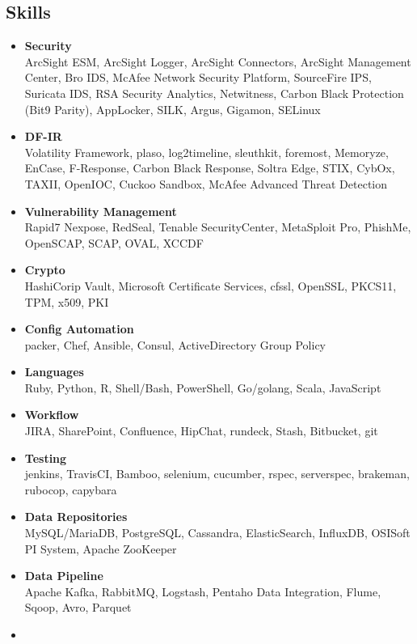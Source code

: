 \documentclass[10pt,]{article}
\begin{document}
\subsection{Skills}\label{skills}

\begin{itemize}
\item
  \textbf{Security}\\
  ArcSight ESM, ArcSight Logger, ArcSight Connectors, ArcSight
  Management Center, Bro IDS, McAfee Network Security Platform,
  SourceFire IPS, Suricata IDS, RSA Security Analytics, Netwitness,
  Carbon Black Protection (Bit9 Parity), AppLocker, SILK, Argus,
  Gigamon, SELinux
\item
  \textbf{DF-IR}\\
  Volatility Framework, plaso, log2timeline, sleuthkit, foremost,
  Memoryze, EnCase, F-Response, Carbon Black Response, Soltra Edge,
  STIX, CybOx, TAXII, OpenIOC, Cuckoo Sandbox, McAfee Advanced Threat
  Detection
\item
  \textbf{Vulnerability Management}\\
  Rapid7 Nexpose, RedSeal, Tenable SecurityCenter, MetaSploit Pro,
  PhishMe, OpenSCAP, SCAP, OVAL, XCCDF
\item
  \textbf{Crypto}\\
  HashiCorip Vault, Microsoft Certificate Services, cfssl, OpenSSL,
  PKCS11, TPM, x509, PKI
\item
  \textbf{Config Automation}\\
  packer, Chef, Ansible, Consul, ActiveDirectory Group Policy
\item
  \textbf{Languages}\\
  Ruby, Python, R, Shell/Bash, PowerShell, Go/golang, Scala, JavaScript
\item
  \textbf{Workflow}\\
  JIRA, SharePoint, Confluence, HipChat, rundeck, Stash, Bitbucket, git
\item
  \textbf{Testing}\\
  jenkins, TravisCI, Bamboo, selenium, cucumber, rspec, serverspec,
  brakeman, rubocop, capybara
\item
  \textbf{Data Repositories}\\
  MySQL/MariaDB, PostgreSQL, Cassandra, ElasticSearch, InfluxDB, OSISoft
  PI System, Apache ZooKeeper
\item
  \textbf{Data Pipeline}\\
  Apache Kafka, RabbitMQ, Logstash, Pentaho Data Integration, Flume,
  Sqoop, Avro, Parquet
\item

\end{itemize}
\end{document}

